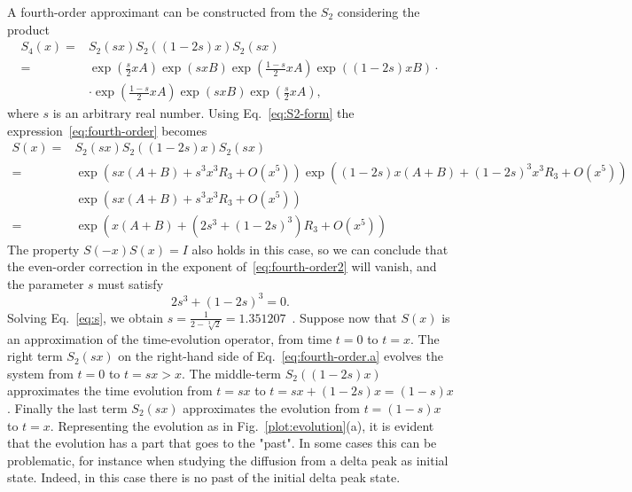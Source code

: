 A fourth-order approximant can be constructed from the $S_2$ considering the product
\begin{subequations} \label{eq:fourth-order}
\begin{align} \label{eq:fourth-order.a}
S_4(x) = & S_2(sx) S_2((1-2s)x) S_2(sx) \\
= & \exp\left({\frac{s}{2}xA}\right) \exp\left({sxB}\right) \exp\left({\frac{1-s}{2}xA}\right) \exp\left({(1-2s)xB}\right) \cdot \nonumber \\
& \cdot \exp\left({\frac{1-s}{2}xA}\right) \exp\left({sxB}\right) \exp\left({\frac{s}{2}xA}\right),
\end{align}
\end{subequations}
where $s$ is an arbitrary real number. Using Eq.~\eqref{eq:S2-form} the expression~\eqref{eq:fourth-order} becomes
\begin{subequations} \label{eq:fourth-order2}
\begin{align} \label{eq:fourth-order2}
S(x) = & S_2(sx) S_2((1-2s)x) S_2(sx)	 \\
= & \exp\left({sx(A+B) + s^3x^3R_3 + O(x^5)}\right) \exp\left({(1-2s)x(A+B) + (1-2s)^3x^3R_3 + O(x^5)}\right) \nonumber \\
& \exp\left({sx(A+B) + s^3x^3R_3 + O(x^5)}\right) \\
= & \exp\left({x(A+B)+(2s^3+(1-2s)^3)R_3+O(x^5)}\right) \label{eq:fourth-order2.3}
\end{align}
\end{subequations}
The property $S(-x)S(x) = I$ also holds in this case, so we can conclude that the even-order correction in the exponent of~\eqref{eq:fourth-order2} will vanish, and the parameter $s$ must satisfy
\begin{equation} \label{eq:s}
2s^3 + (1-2s)^3 = 0.
\end{equation}
Solving Eq.~\eqref{eq:s}, we obtain $s = \frac{1}{2-\sqrt[3]{2}} = 1.351207$~. Suppose now that $S(x)$ is an approximation of the time-evolution operator, from time $t=0$ to $t=x$. The right term $S_2(sx)$ on the right-hand side of Eq.~\eqref{eq:fourth-order.a} evolves the system from $t=0$ to $t=sx>x$. The middle-term $S_2((1-2s)x)$ approximates the time evolution from $t=sx$ to $t=sx + (1-2s)x = (1-s)x$. Finally the last term $S_2(sx)$ approximates the evolution from $t=(1-s)x$ to $t=x$. Representing the evolution as in Fig.~\ref{plot:evolution}(a), it is evident that the evolution has a part that goes to the "past". In some cases this can be problematic, for instance when studying the diffusion from a delta peak as initial state. Indeed, in this case there is no past of the initial delta peak state. 

